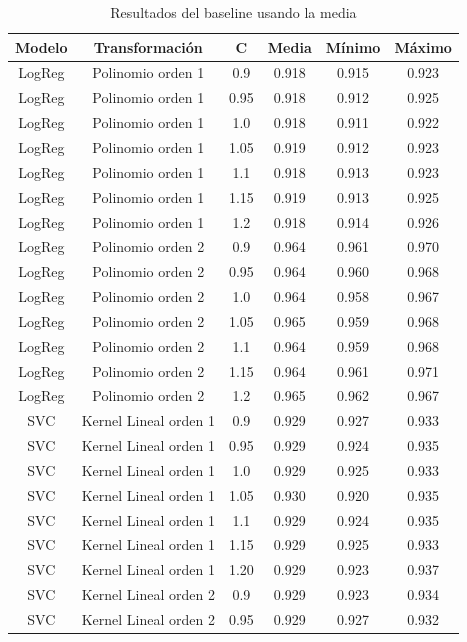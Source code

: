 \documentclass[11pt]{article}
\begin{document}
\begin{table}[H]
\centering
\begin{tabular}{|c|c|c|c|c|c|}
    \hline
    \textbf{Modelo} & \textbf{Transformación} & \textbf{C} & \textbf{Media} & \textbf{Mínimo} & \textbf{Máximo} \\
    \hline
    LogReg & Polinomio orden 1 & 0.9 & 0.918 & 0.915 & 0.923 \\
    LogReg & Polinomio orden 1 & 0.95 & 0.918 & 0.912 & 0.925 \\
    LogReg & Polinomio orden 1 & 1.0 & 0.918 & 0.911 & 0.922 \\
    LogReg & Polinomio orden 1 & 1.05 & 0.919 & 0.912 & 0.923 \\
    LogReg & Polinomio orden 1 & 1.1 & 0.918 & 0.913 & 0.923 \\
    LogReg & Polinomio orden 1 & 1.15 & 0.919 & 0.913 & 0.925 \\
    LogReg & Polinomio orden 1 & 1.2 & 0.918 & 0.914 & 0.926 \\
    LogReg & Polinomio orden 2 & 0.9 & 0.964 & 0.961 & 0.970 \\
    LogReg & Polinomio orden 2 & 0.95 & 0.964 & 0.960 & 0.968 \\
    LogReg & Polinomio orden 2 & 1.0 & 0.964 & 0.958 & 0.967 \\
    LogReg & Polinomio orden 2 & 1.05 & 0.965 & 0.959 & 0.968 \\
    LogReg & Polinomio orden 2 & 1.1 & 0.964 & 0.959 & 0.968 \\
    LogReg & Polinomio orden 2 & 1.15 & 0.964 & 0.961 & 0.971 \\
    LogReg & Polinomio orden 2 & 1.2 & 0.965 & 0.962 & 0.967 \\
    SVC & Kernel Lineal orden 1 & 0.9 & 0.929 & 0.927 & 0.933 \\
    SVC & Kernel Lineal orden 1 & 0.95 & 0.929 & 0.924 & 0.935 \\
    SVC & Kernel Lineal orden 1 & 1.0 & 0.929 & 0.925 & 0.933 \\
    SVC & Kernel Lineal orden 1 & 1.05 & 0.930 & 0.920 & 0.935 \\
    SVC & Kernel Lineal orden 1 & 1.1 & 0.929 & 0.924 & 0.935 \\
    SVC & Kernel Lineal orden 1 & 1.15 & 0.929 & 0.925 & 0.933 \\
    SVC & Kernel Lineal orden 1 & 1.20 & 0.929 & 0.923 & 0.937 \\
    SVC & Kernel Lineal orden 2 & 0.9 & 0.929 & 0.923 & 0.934 \\
    SVC & Kernel Lineal orden 2 & 0.95 & 0.929 & 0.927 & 0.932 \\
    \hline
\end{tabular}
    \caption{Resultados del baseline usando la media}
\end{table}
\end{document}
